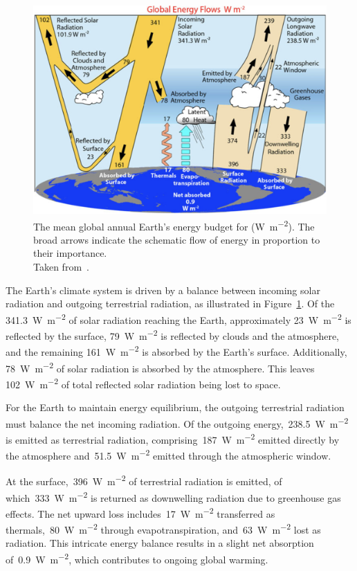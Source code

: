 \begin{figure}
	\centering
	\includegraphics[width = .7 \textwidth]{figs/global-mean-energy-budget-trenberth}
	\caption{The mean global annual Earth’s energy budget for  (\unit{\watt.\meter^{-2}}). The broad arrows indicate
		the schematic flow of energy in proportion to their importance. \\ Taken from~\citet{Trenberth2012}.}
	\label{fig:global-mean-energy-budget}
\end{figure}

The Earth’s climate system is driven by a balance between incoming solar radiation and outgoing terrestrial radiation, as illustrated in Figure~\ref{fig:global-mean-energy-budget}. Of the \qty{341.3}{\watt\per\meter\squared} of solar radiation reaching the Earth, approximately \qty{23}{\watt\per\meter\squared} is reflected by the surface, \qty{79}{\watt\per\meter\squared} is reflected by clouds and the atmosphere, and the remaining \qty{161}{\watt\per\meter\squared} is absorbed by the Earth’s surface. Additionally, \qty{78}{\watt\per\meter\squared} of solar radiation is absorbed by the atmosphere. This leaves \qty{102}{\watt\per\meter\squared} of total reflected solar radiation being lost to space.

For the Earth to maintain energy equilibrium, the outgoing terrestrial radiation must balance the net incoming radiation.
Of the outgoing energy,~\qty{238.5}{\watt\per\meter\squared} is emitted as terrestrial radiation, comprising~\qty{187}{\watt\per\meter\squared}
emitted directly by the atmosphere and~\qty{51.5}{\watt\per\meter\squared} emitted through the atmospheric window.

At the surface,~\qty{396}{\watt\per\meter\squared} of terrestrial radiation is emitted, of which~\qty{333}{\watt\per\meter\squared}
is returned as downwelling radiation due to greenhouse gas effects.
The net upward loss includes~\qty{17}{\watt\per\meter\squared} transferred as thermals,~\qty{80}{\watt\per\meter\squared}
through evapotranspiration, and~\qty{63}{\watt\per\meter\squared} lost as radiation.
This intricate energy balance results in a slight net absorption of~\qty{0.9}{\watt\per\meter\squared},
which contributes to ongoing global warming.


